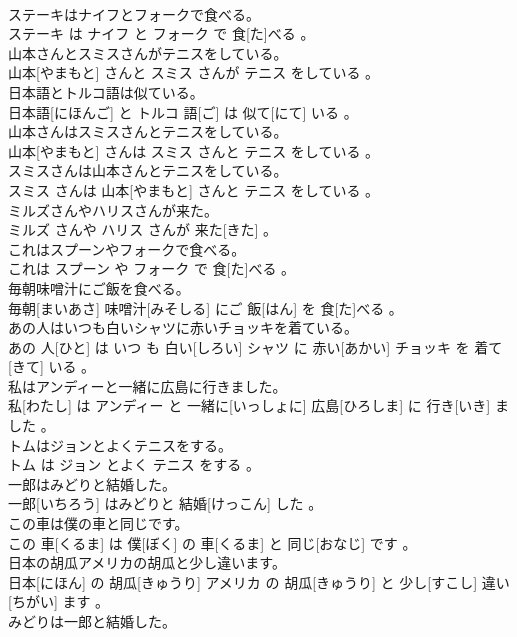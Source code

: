 \documentclass[8pt]{extreport}
\begin{document}
\begin{CJK}{UTF8}{min}
\\	ステーキはナイフとフォークで食べる。	
\\	ステーキ は ナイフ と フォーク で 食[た]べる 。
\\	山本さんとスミスさんがテニスをしている。	
\\	山本[やまもと] さんと スミス さんが テニス をしている 。
\\	日本語とトルコ語は似ている。	
\\	日本語[にほんご] と トルコ 語[ご] は 似て[にて] いる 。
\\	山本さんはスミスさんとテニスをしている。	
\\	山本[やまもと] さんは スミス さんと テニス をしている 。
\\	スミスさんは山本さんとテニスをしている。	
\\	スミス さんは 山本[やまもと] さんと テニス をしている 。
\\	ミルズさんやハリスさんが来た。	
\\	ミルズ さんや ハリス さんが 来た[きた] 。
\\	これはスプーンやフォークで食べる。	
\\	これは スプーン や フォーク で 食[た]べる 。
\\	毎朝味噌汁にご飯を食べる。	
\\	毎朝[まいあさ] 味噌汁[みそしる] にご 飯[はん] を 食[た]べる 。
\\	あの人はいつも白いシャツに赤いチョッキを着ている。	
\\	あの 人[ひと] は いつ も 白い[しろい] シャツ に 赤い[あかい] チョッキ を 着て[きて] いる 。
\\	私はアンディーと一緒に広島に行きました。	
\\	私[わたし] は アンディー と 一緒に[いっしょに] 広島[ひろしま] に 行き[いき] ました 。
\\	トムはジョンとよくテニスをする。	
\\	トム は ジョン とよく テニス をする 。
\\	一郎はみどりと結婚した。	
\\	一郎[いちろう] はみどりと 結婚[けっこん] した 。
\\	この車は僕の車と同じです。	
\\	この 車[くるま] は 僕[ぼく] の 車[くるま] と 同じ[おなじ] です 。
\\	日本の胡瓜アメリカの胡瓜と少し違います。	
\\	日本[にほん] の 胡瓜[きゅうり] アメリカ の 胡瓜[きゅうり] と 少し[すこし] 違い[ちがい] ます 。
\\	みどりは一郎と結婚した。	

\end{CJK}
\end{document}
